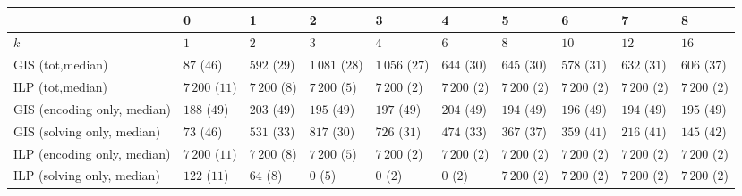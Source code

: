 \begin{tabular}{llllllllll}
\toprule
{} &                0 &               1 &                2 &                3 &               4 &               5 &               6 &               7 &               8 \\
\midrule
$k$                         &              $1$ &             $2$ &              $3$ &              $4$ &             $6$ &             $8$ &            $10$ &            $12$ &            $16$ \\
GIS (tot,median)            &      $87$ ($46$) &    $592$ ($29$) &  $1\,081$ ($28$) &  $1\,056$ ($27$) &    $644$ ($30$) &    $645$ ($30$) &    $578$ ($31$) &    $632$ ($31$) &    $606$ ($37$) \\
ILP (tot,median)            &  $7\,200$ ($11$) &  $7\,200$ ($8$) &   $7\,200$ ($5$) &   $7\,200$ ($2$) &  $7\,200$ ($2$) &  $7\,200$ ($2$) &  $7\,200$ ($2$) &  $7\,200$ ($2$) &  $7\,200$ ($2$) \\
GIS (encoding only, median) &     $188$ ($49$) &    $203$ ($49$) &     $195$ ($49$) &     $197$ ($49$) &    $204$ ($49$) &    $194$ ($49$) &    $196$ ($49$) &    $194$ ($49$) &    $195$ ($49$) \\
GIS (solving only, median)  &      $73$ ($46$) &    $531$ ($33$) &     $817$ ($30$) &     $726$ ($31$) &    $474$ ($33$) &    $367$ ($37$) &    $359$ ($41$) &    $216$ ($41$) &    $145$ ($42$) \\
ILP (encoding only, median) &  $7\,200$ ($11$) &  $7\,200$ ($8$) &   $7\,200$ ($5$) &   $7\,200$ ($2$) &  $7\,200$ ($2$) &  $7\,200$ ($2$) &  $7\,200$ ($2$) &  $7\,200$ ($2$) &  $7\,200$ ($2$) \\
ILP (solving only, median)  &     $122$ ($11$) &      $64$ ($8$) &        $0$ ($5$) &        $0$ ($2$) &       $0$ ($2$) &  $7\,200$ ($2$) &  $7\,200$ ($2$) &  $7\,200$ ($2$) &  $7\,200$ ($2$) \\
\bottomrule
\end{tabular}
